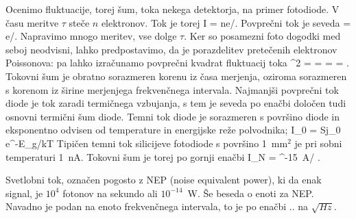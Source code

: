 Ocenimo fluktuacije, torej šum, toka nekega detektorja, na primer fotodiode. V času
meritve $\tau$ steče $n$ elektronov. Tok je torej
\beq
I = ne/\tau.
\eeq
Povprečni tok je seveda
\beq
{} = e/\tau.
\eeq
Napravimo mnogo meritev, vse dolge $\tau$. Ker so posamezni foto dogodki med seboj neodvisni, 
lahko predpostavimo, da je porazdelitev pretečenih elektronov Poissonova: pa lahko izračunamo
povprečni kvadrat fluktuacij toka
\beq
\sigma^2 =  =   = 
 = .
\eeq
Tokovni šum je obratno sorazmeren korenu iz časa merjenja, oziroma sorazmeren s korenom
iz širine merjenjega frekvenčnega intervala. Najmanjši povprečni tok diode je tok zaradi
termičnega vzbujanja, s tem je seveda po enačbi določen tudi osnovni termični šum diode.
Temni tok diode je sorazmeren s površino diode in eksponentno odvisen od temperature in 
energijske reže polvodnika;
\beq
I_0 = Sj_0 e^{-E_g/kT}
\eeq
Tipičen temni tok silicijeve fotodiode s površino 1~mm$^2$ je pri sobni temperaturi 1~nA. 
Tokovni šum je torej po gornji enačbi
\beq
I_N =  ^{-15}~A/ \sqrt{\Delta \nu}.
\eeq

Svetlobni tok, označen pogosto z NEP (noise equivalent power), ki da enak signal, je $10^4 $
fotonov na sekundo ali $10^{-14}$~W. Še beseda o enoti za NEP. Navadno je podan na enoto 
frekvenčnega intervala, to je po enačbi .. na $\sqrt{Hz}$. 